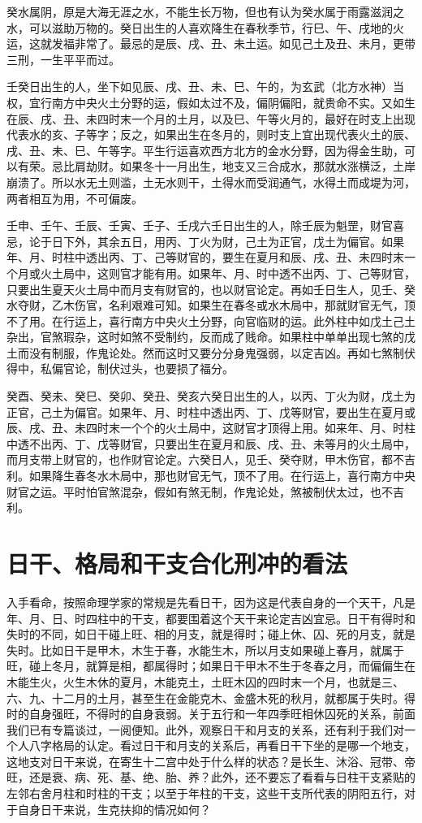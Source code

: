 \documentclass[a5paper,oneside,12pt]{ctexbook}
\begin{document}
癸水属阴，原是大海无涯之水，不能生长万物，但也有认为癸水属于雨露滋润之水，可以滋助万物的。癸日出生的人喜欢降生在春秋季节，行巳、午、戌地的火运，这就发福非常了。最忌的是辰、戌、丑、未土运。如见己土及丑、未月，更带三刑，一生平平而过。

壬癸日出生的人，坐下如见辰、戌、丑、未、巳、午的，为玄武（北方水神）当权，宜行南方中央火土分野的运，假如太过不及，偏阴偏阳，就贵命不实。又如生在辰、戌、丑、未四时末一个月的土月，以及巳、午等火月的，最好在时支上出现代表水的亥、子等字；反之，如果出生在冬月的，则时支上宜出现代表火土的辰、戌、丑、未、巳、午等字。平生行运喜欢西方北方的金水分野，因为得金生助，可以有荣。忌比肩劫财。如果冬十一月出生，地支又三合成水，那就水涨横泛，土岸崩溃了。所以水无土则滥，土无水则干，土得水而受润通气，水得土而成堤为河，两者相互为用，不可偏废。

壬申、壬午、壬辰、壬寅、壬子、壬戌六壬日出生的人，除壬辰为魁罡，财官喜忌，论于日下外，其余五日，用丙、丁火为财，己土为正官，戊土为偏官。如果年、月、时柱中透出丙、丁、己等财官的，要生在夏月和辰、戌、丑、未四时末一个月或火土局中，这则官才能有用。如果年、月、时中透不出丙、丁、己等财官，只要出生夏天火土局中而月支有财官的，也以财官论定。再如壬日生人，见壬、癸水夺财，乙木伤官，名利艰难可知。如果生在春冬或水木局中，那就财官无气，顶不了用。在行运上，喜行南方中央火土分野，向官临财的运。此外柱中如戊土己土杂出，官煞瑕杂，这时如煞不受制约，反而成了贱命。如果柱中单单出现七煞的戊土而没有制服，作鬼论处。然而这时又要分分身鬼强弱，以定吉凶。再如七煞制伏得中，私偏官论，制伏过头，也要损了福分。

癸酉、癸未、癸巳、癸卯、癸丑、癸亥六癸日出生的人，以丙、丁火为财，戊土为正官，己土为偏官。如果年、月、时柱中透出丙、丁、戊等财官，要出生在夏月或辰、戌、丑、未四时末一个个的火土局中，这财官才顶得上用。如来年、月、时柱中透不出丙、丁、戊等财官，只要出生在夏月和辰、戌、丑、未等月的火土局中，而月支带上财官的，也作财官论定。六癸日人，见壬、癸夺财，甲木伤官，都不吉利。如果降生春冬水木局中，那也财官无气，顶不了用。在行运上，喜行南方中央财官之运。平时怕官煞混杂，假如有煞无制，作鬼论处，煞被制伏太过，也不吉利。

\section{日干、格局和干支合化刑冲的看法}

入手看命，按照命理学家的常规是先看日干，因为这是代表自身的一个天干，凡是年、月、日、时四柱中的干支，都要围着这个天干来论定吉凶宜忌。日干有得时和失时的不同，如日干碰上旺、相的月支，就是得时；碰上休、囚、死的月支，就是失时。比如日干是甲木，木生于春，水能生木，所以月支如果碰上春月，就属于旺，碰上冬月，就算是相，都属得时；如果日干甲木不生于冬春之月，而偏偏生在木能生火，火生木休的夏月，木能克土，土旺木囚的四时末一个月，也就是三、六、九、十二月的土月，甚至生在金能克木、金盛木死的秋月，就都属于失时。得时的自身强旺，不得时的自身衰弱。关于五行和一年四季旺相休囚死的关系，前面我们已有专篇谈过，一阅便知。此外，观察日干和月支的关系，还有利于我们对一个人八字格局的认定。看过日干和月支的关系后，再看日干下坐的是哪一个地支，这地支对日干来说，在寄生十二宫中处于什么样的状态？是长生、沐浴、冠带、帝旺，还是衰、病、死、基、绝、胎、养？此外，还不要忘了看看与日柱干支紧贴的左邻右舍月柱和时柱的干支；以至于年柱的干支，这些干支所代表的阴阳五行，对于自身日干来说，生克扶抑的情况如何？
\end{document}
